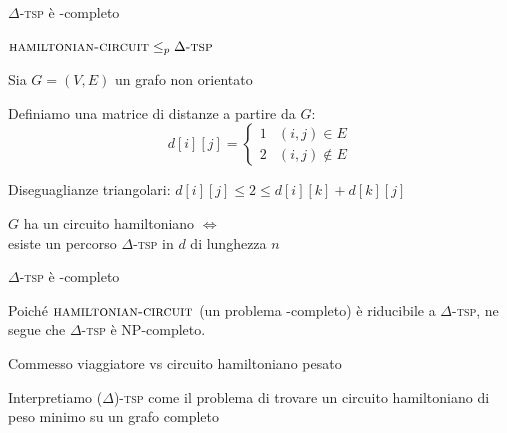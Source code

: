 \begin{frame}{$\Delta$-\textsc{tsp} è \NP-completo}

\vspace{-9pt}
\begin{myboxtitle}[Lemma]
$\textsc{hamiltonian-circuit} \leq_p \textrm{$\Delta$-\textsc{tsp}}$
\end{myboxtitle}
\begin{overprint}
\begin{myboxtitle}[Dimostrazione]
\BIL
\item Sia $G=(V,E)$ un grafo non orientato 
\item Definiamo una matrice di distanze a partire da $G$:
\[
  d[i][j] = \begin{cases}
    1 & (i,j) \in E \\
    2 & (i,j) \notin E
  \end{cases}
\]    
\item Diseguaglianze triangolari: 
$
  d[i][j] \leq 2 \leq d[i][k]+d[k][j]
$
\item $G$ ha un circuito hamiltoniano $\Leftrightarrow$\\
esiste un percorso $\Delta$-\textsc{tsp} in $d$ di lunghezza $n$
\EIL
\end{myboxtitle}
\begin{myboxtitle}[Teorema]
$\Delta$-\textsc{tsp} è \NP-completo
\end{myboxtitle}
\begin{myboxtitle}[Dimostrazione]
Poiché $\textsc{hamiltonian-circuit}$ (un problema \NP-completo) è riducibile a $\Delta$-\textsc{tsp}, ne segue che $\Delta$-\textsc{tsp} è NP-completo.
\end{myboxtitle}
\end{overprint}
\end{frame}

\begin{frame}{Commesso viaggiatore vs circuito hamiltoniano pesato}


\vspace{-9pt}
\BIL
\item Interpretiamo ($\Delta$)-\textsc{tsp} come il problema di trovare
un circuito hamiltoniano di peso minimo su un grafo completo
\EIL

\end{frame}


